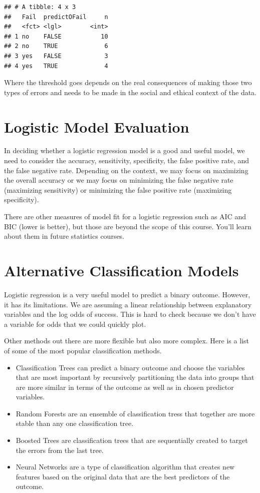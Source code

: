 \documentclass[
]{book}
\begin{document}
\begin{verbatim}
## # A tibble: 4 x 3
##   Fail  predictOFail     n
##   <fct> <lgl>        <int>
## 1 no    FALSE           10
## 2 no    TRUE             6
## 3 yes   FALSE            3
## 4 yes   TRUE             4
\end{verbatim}

Where the threshold goes depends on the real consequences of making those two types of errors and needs to be made in the social and ethical context of the data.

\hypertarget{logistic-model-evaluation}{%
\section{Logistic Model Evaluation}\label{logistic-model-evaluation}}

In deciding whether a logistic regression model is a good and useful model, we need to consider the accuracy, sensitivity, specificity, the false positive rate, and the false negative rate. Depending on the context, we may focus on maximizing the overall accuracy or we may focus on minimizing the false negative rate (maximizing sensitivity) or minimizing the false positive rate (maximizing specificity).

There are other measures of model fit for a logistic regression such as AIC and BIC (lower is better), but those are beyond the scope of this course. You'll learn about them in future statistics courses.

\hypertarget{alternative-classification-models}{%
\section{Alternative Classification Models}\label{alternative-classification-models}}

Logistic regression is a very useful model to predict a binary outcome. However, it has its limitations. We are assuming a linear relationship between explanatory variables and the log odds of success. This is hard to check because we don't have a variable for odds that we could quickly plot.

Other methods out there are more flexible but also more complex. Here is a list of some of the most popular classification methods.

\begin{itemize}
\item
  Classification Trees can predict a binary outcome and choose the variables that are most important by recursively partitioning the data into groups that are more similar in terms of the outcome as well as in chosen predictor variables.
\item
  Random Forests are an ensemble of classification tress that together are more stable than any one classification tree.
\item
  Boosted Trees are classification trees that are sequentially created to target the errors from the last tree.
\item
  Neural Networks are a type of classification algorithm that creates new features based on the original data that are the best predictors of the outcome.
\end{itemize}
\end{document}
